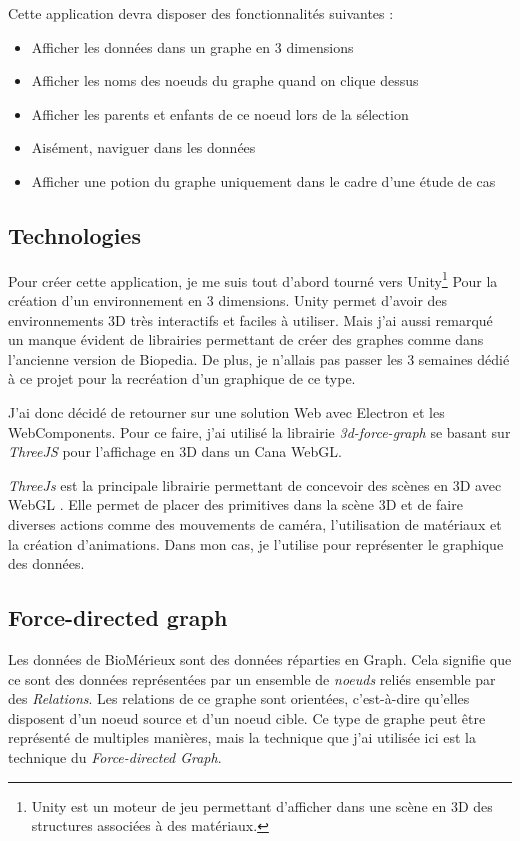 Cette application devra disposer des fonctionnalités suivantes :

\begin{itemize}
    \item Afficher les données dans un graphe en 3 dimensions
    \item Afficher les noms des noeuds du graphe quand on clique dessus
    \item Afficher les parents et enfants de ce noeud lors de la sélection
    \item Aisément, naviguer dans les données
    \item Afficher une potion du graphe uniquement dans le cadre d'une étude de cas
\end{itemize}

\subsection{Technologies}
\label{biomerieuxBiopediaTéchnologies}

Pour créer cette application, je me suis tout d'abord tourné vers Unity\footnote{Unity est un moteur de jeu permettant d'afficher dans une scène en 3D des structures associées à des matériaux.} Pour la création d'un environnement en 3 dimensions.
Unity permet d'avoir des environnements 3D très interactifs et faciles à utiliser.
Mais j'ai aussi remarqué un manque évident de librairies permettant de créer des graphes comme dans l'ancienne version de Biopedia.
De plus, je n'allais pas passer les 3 semaines dédié à ce projet pour la recréation d'un graphique de ce type.

J'ai donc décidé de retourner sur une solution Web avec Electron et les WebComponents.
Pour ce faire, j'ai utilisé la librairie \emph{3d-force-graph} se basant sur \emph{ThreeJS} pour l'affichage en 3D dans un Cana WebGL.

\emph{ThreeJs} est la principale librairie permettant de concevoir des scènes en 3D avec WebGL .
Elle permet de placer des primitives dans la scène 3D et de faire diverses actions comme des mouvements de caméra, l'utilisation de matériaux et la création d'animations.
Dans mon cas, je l'utilise pour représenter le graphique des données.

\subsection{Force-directed graph}
\label{biomerieuxBiopediaForceDirectedGraph}

Les données de BioMérieux sont des données réparties en Graph.
Cela signifie que ce sont des données représentées par un ensemble de \emph{noeuds} reliés ensemble par des \emph{Relations}.
Les relations de ce graphe sont orientées, c'est-à-dire qu'elles disposent d'un noeud source et d'un noeud cible.
Ce type de graphe peut être représenté de multiples manières, mais la technique que j'ai utilisée ici est la technique du \emph{Force-directed Graph}.


